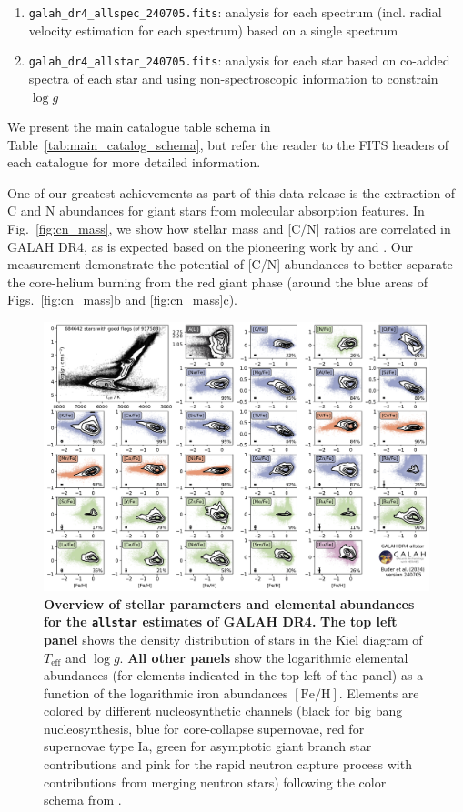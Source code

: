 \documentclass[
  journal=pasa,
  manuscript=research-paper, %
  year=2024,
  volume=37
]{cup-journal}
\newcommand{\Teff}{$T_\mathrm{eff}$\xspace}
\newcommand{\logg}{$\log g$\xspace}
\newcommand{\feh}{$\mathrm{[Fe/H]}$\xspace}
\begin{document}
\begin{enumerate}
   \item \texttt{galah\_dr4\_allspec\_240705.fits}: analysis for each spectrum (incl. radial velocity estimation for each spectrum) based on a single spectrum
   \item \texttt{galah\_dr4\_allstar\_240705.fits}: analysis for each star based on co-added spectra of each star and using non-spectroscopic information to constrain \logg
\end{enumerate}

We present the main catalogue table schema in Table~\ref{tab:main_catalog_schema}, but refer the reader to the FITS headers of each catalogue for more detailed information.

One of our greatest achievements as part of this data release is the extraction of C and N abundances for giant stars from molecular absorption features. In Fig.~\ref{fig:cn_mass}, we show how stellar mass and [C/N] ratios are correlated in GALAH DR4, as is expected based on the pioneering work by \citet{Masseron2015} and \citet{Martig2016}. Our measurement demonstrate the potential of [C/N] abundances to better separate the core-helium burning from the red giant phase (around the blue areas of Figs.~\ref{fig:cn_mass}b and \ref{fig:cn_mass}c).

\begin{landscape}
\begin{figure}[ht]
\includegraphics[width=0.975\columnwidth]{figures/galah_dr4_overview_allstar.png}
\caption{
\textbf{Overview of stellar parameters and elemental abundances for the \texttt{allstar} estimates of GALAH DR4.}
\textbf{The top left panel} shows the density distribution of stars in the Kiel diagram of \Teff and \logg.
\textbf{All other panels} show the logarithmic elemental abundances (for elements indicated in the top left of the panel) as a function of the logarithmic iron abundances \feh. Elements are colored by different nucleosynthetic channels (black for big bang nucleosynthesis, blue for core-collapse supernovae, red for supernovae type Ia, green for asymptotic giant branch star contributions and pink for the rapid neutron capture process with contributions from merging neutron stars) following the color schema from \citet{Kobayashi2020}.
}
\label{fig:galah_dr4_overview_allstar}
\end{figure}
\end{landscape}
\end{document}

